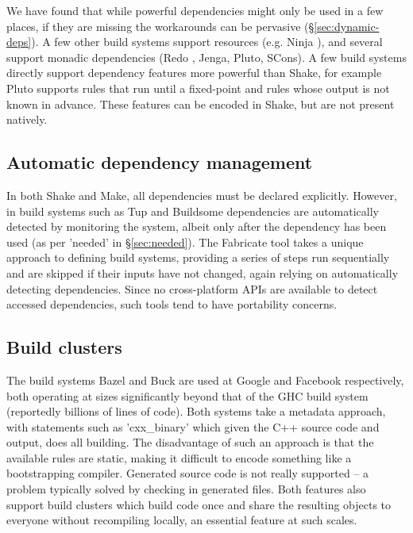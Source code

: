 We have found that while powerful dependencies might only be used in a few places, if they are missing the workarounds can be pervasive (\S\ref{sec:dynamic-deps}). A few other build systems support resources (e.g. Ninja \cite{ninja}), and several support monadic dependencies (Redo \cite{redo}, Jenga, Pluto, SCons). A few build systems directly support dependency features more powerful than Shake, for example Pluto supports rules that run until a fixed-point and rules whose output is not known in advance. These features can be encoded in Shake, but are not present natively.

\subsection{Automatic dependency management}

In both Shake and Make, all dependencies must be declared explicitly. However, in build systems such as Tup \cite{tup} and Buildsome \cite{buildsome} dependencies are automatically detected by monitoring the system, albeit only after the dependency has been used (as per \lst'needed' in \S\ref{sec:needed}). The Fabricate tool \cite{fabricate} takes a unique approach to defining build systems, providing a series of steps run sequentially and are skipped if their inputs have not changed, again relying on automatically detecting dependencies. Since no cross-platform APIs are available to detect accessed dependencies, such tools tend to have portability concerns.

\subsection{Build clusters}

The build systems Bazel and Buck \cite{buck} are used at Google and Facebook respectively, both operating at sizes significantly beyond that of the GHC build system (reportedly billions of lines of code). Both systems take a metadata approach, with statements such as \lst'cxx_binary' which given the C++ source code and output, does all building. The disadvantage of such an approach is that the available rules are static, making it difficult to encode something like a bootstrapping compiler. Generated source code is not really supported -- a problem typically solved by checking in generated files. Both features also support build clusters which build code once and share the resulting objects to everyone without recompiling locally, an essential feature at such scales.
